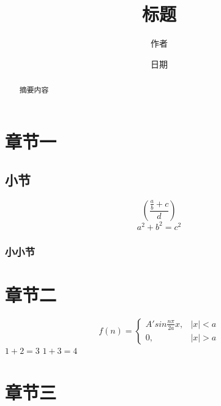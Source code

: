 \documentclass[a4paper,10pt]{article}
\begin{document}
   \title{标题}
   \author{作者}
   \date{日期}
   \maketitle
   \newpage
   \tableofcontents{}
   \newpage
   \begin{abstract}
   	摘要内容
   \end{abstract}
   \newpage
   \section{章节一}
   \subsection{小节}
   $$\left(\frac{{\frac ab +c}}{d}\right)$$
   $$a^2+b^2=c^2$$

   \subsubsection{小小节}
    \newpage
   \section{章节二}
 $$f(n) = \begin{cases}
 	 A'sin{\frac{n\pi}{2a}x}, &|x|<a\\
 	 0, &|x|>a
   \end{cases}$$
   $1+2=3$
   $1+3=4$
   \section{章节三}
 
\end{document}
